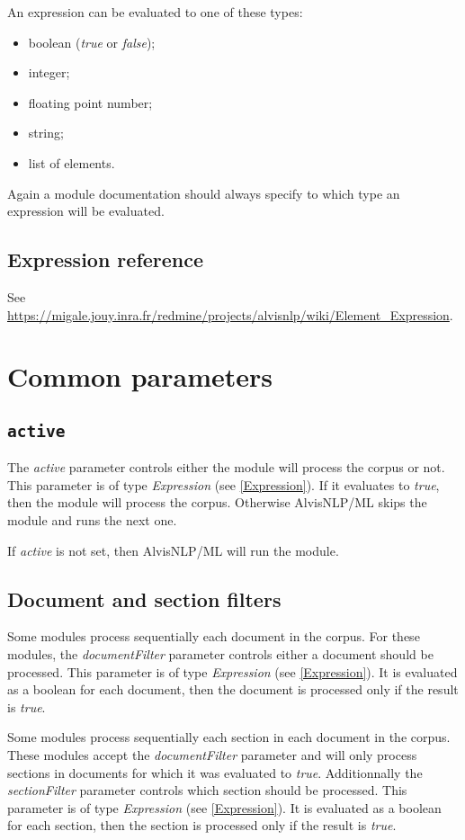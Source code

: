\documentclass[a4paper]{book}
\begin{document}
An expression can be evaluated to one of these types:
\begin{itemize}
\item boolean (\emph{true} or \emph{false});
\item integer;
\item floating point number;
\item string;
\item list of elements.
\end{itemize}
Again a module documentation should always specify to which type an expression will be evaluated.

\subsection{Expression reference}

See \url{https://migale.jouy.inra.fr/redmine/projects/alvisnlp/wiki/Element_Expression}.

\section{Common parameters}

\subsection{\texttt{active}}
\label{Active}
The \emph{active} parameter controls either the module will process the corpus or not.
This parameter is of type \emph{Expression} (see \ref{Expression}).
If it evaluates to \emph{true}, then the module will process the corpus.
Otherwise AlvisNLP/ML skips the module and runs the next one.

If \emph{active} is not set, then AlvisNLP/ML will run the module.

\subsection{Document and section filters}
Some modules process sequentially each document in the corpus.
For these modules, the \emph{documentFilter} parameter controls either a document should be processed.
This parameter is of type \emph{Expression} (see \ref{Expression}).
It is evaluated as a boolean for each document, then the document is processed only if the result is \emph{true}.

Some modules process sequentially each section in each document in the corpus.
These modules accept the \emph{documentFilter} parameter and will only process sections in documents for which it was evaluated to \emph{true}.
Additionnally the \emph{sectionFilter} parameter controls which section should be processed.
This parameter is of type \emph{Expression} (see \ref{Expression}).
It is evaluated as a boolean for each section, then the section is processed only if the result is \emph{true}.
\end{document}
